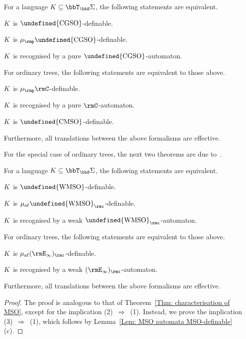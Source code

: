 \documentclass[10pt, fleqn]{scrartcl}
\makeatletter
\newcommand\m@thsm@ller[2]{\mbox{\relscale{0.91}$\m@th#1#2$}}
\let\smaller\undefined
\DeclareRobustCommand\smaller[1]{\relax\ifmmode{\mathpalette\m@thsm@ller{#1}}\else{\relscale{0.91}#1}\fi}
\newcommand*{\WMSO}{\smaller{\mathrm{WMSO}}}
\newcommand*{\CMSO}{\smaller{\mathrm{CMSO}}}
\newcommand*{\CGSO}{\smaller{\mathrm{CGSO}}}
\newcommand*{\muaf}{\mu_{\mathrm{af}}}
\newcommand*{\mup}{\mu_\rmp}
\newcommand*{\?}{\kern .08em}
\makeatother
\begin{document}
\begin{Thm}
For a language $K \subseteq \bbT_\bbS\Sigma$, the following statements are equivalent.
\begin{enum1}
\item $K$~is $\CGSO$-definable.
\item $K$~is $\mup\CGSO$-definable.
\item $K$~is recognised by a pure $\CGSO$-automaton.
\end{enum1}
For ordinary trees, the following statements are equivalent to those above.
\begin{enum1}[start=4]
\item $K$~is $\mup\rmC$-definable.
\item $K$~is recognised by a pure $\rmC$-automaton.
\item $K$~is $\CMSO$-definable.
\end{enum1}
Furthermore, all translations between the above formalisms are effective.
\end{Thm}

For the special case of ordinary trees, the next two theorems are due to~\cite{Carreiro15}.
\begin{Thm}\label{Thm: characterisation of WMSO}
For a language $K \subseteq \bbT_\bbS\Sigma$, the following statements are equivalent.
\begin{enum1}
\item $K$~is $\WMSO$-definable.
\item $K$~is $\muaf\WMSO_\rmc$-definable.
\item $K$~is recognised by a weak $\WMSO_\rmc$-automaton.
\end{enum1}
For ordinary trees, the following statements are equivalent to those above.
\begin{enum1}[start=4]
\item $K$~is $\muaf(\rmE_\infty)_\rmc$-definable.
\item $K$~is recognised by a weak $(\rmE_\infty)_\rmc$-automaton.
\end{enum1}
Furthermore, all translations between the above formalisms are effective.
\end{Thm}
\begin{proof}
The proof is analogous to that of Theorem~\ref{Thm: characterisation of MSO}, except
for the implication (2)~$\Rightarrow$~(1).
Instead, we prove the implication (3)~$\Rightarrow$~(1), which follows
by Lemma~\ref{Lem: MSO automata MSO-definable}\,(c).
\end{proof}
\end{document}
